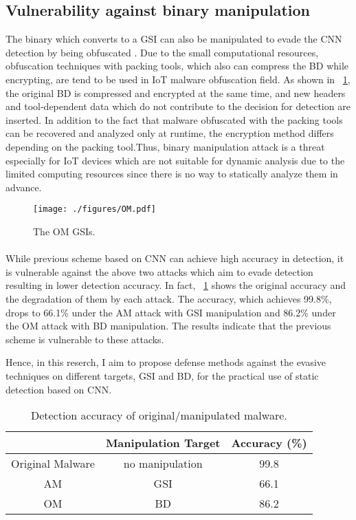 \subsection{Vulnerability against binary manipulation}
The binary which converts to a GSI can also be manipulated to evade the CNN detection by being obfuscated \cite{om}.
Due to the small computational resources, obfuscation techniques with packing tools, which also can compress the BD while encrypting, are tend to be used in IoT malware obfuscation field.
As shown in \figurename~\ref{fig:omGSI}, the original BD is compressed and encrypted at the same time, and new headers and tool-dependent data which do not contribute to the decision for detection are inserted.
In addition to the fact that malware obfuscated with the packing tools can be recovered and analyzed only at runtime, the encryption method differs depending on the packing tool.Thus, binary manipulation attack is a threat especially for IoT devices which are not suitable for dynamic analysis due to the limited computing resources since there is no way to statically analyze them in advance.

\begin{figure}[h]
 \centering
 \texttt{[image: ./figures/OM.pdf]}
 \caption{The OM GSIs.} 
 \label{fig:omGSI}
\end{figure}
\newpage


\paragraph*{}
While previous scheme based on CNN can achieve high accuracy in detection, it is vulnerable against the above two attacks which aim to evade detection resulting in lower detection accuracy.
In fact, \tablename~\ref{tab:prev} shows the original accuracy and the degradation of them by each attack.
The accuracy, which achieves 99.8\%, drops to 66.1\% under the AM attack with GSI manipulation and 86.2\% under the OM attack with BD manipulation.
The results indicate that the previous scheme is vulnerable to these attacks.

Hence, in this reserch, I aim to propose defense methods against the evasive techniques on different targets, GSI and BD, for the practical use of static detection based on CNN.

\begin{table}[h]
  \begin{center}
    \caption{Detection accuracy of original/manipulated malware.}
    \label{tab:prev} 
    \begin{tabular}{|c|c|c|} \hline
       & Manipulation Target & Accuracy (\%) \\ \hline \hline
      Original Malware & no manipulation  & 99.8  \\ \hline
      AM & GSI & 66.1  \\ \hline 
      OM & BD & 86.2 \\ \hline
    \end{tabular}
  \end{center}
\end{table} 
\newpage
